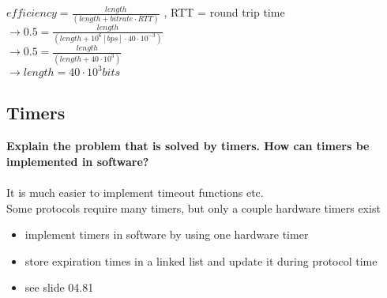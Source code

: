 \documentclass[a4paper,12pt]{article}
\begin{document}
	\begin{doublespace}
		$efficiency = \frac{length}{(length + bitrate \cdot RTT)} $ , RTT = round trip time\\
		$\rightarrow 0.5 = \frac{length}{(length + 10^6 [bps]  \cdot  40 \cdot 10^{-3})} $ \\
		$\rightarrow 0.5 = \frac{length}{(length + 40 \cdot 10^3)}$ \\
		$\rightarrow length = 40 \cdot 10^3 bits$
	\end{doublespace}
	
	\subsection{Timers}
	\textbf{Explain the problem that is solved by timers. How can timers be implemented in software?}\\
	\\
	It is much easier to implement timeout functions etc.\\
	Some protocols require many timers, but only a couple hardware timers exist
	\begin{itemize}[itemsep=0pt]
		\item implement timers in software by using one hardware timer
		\item store expiration times in a linked list and update it during protocol time
		\item see slide 04.81 
	\end{itemize}
	
	
	
\end{document}
